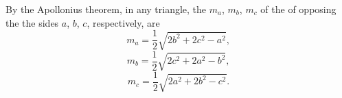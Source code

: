 \documentclass[12pt]{article}
\theoremstyle{definition}
\begin{document}
By the Apollonius theorem, in any triangle, the  $m_a$, $m_b$, $m_c$ of the  of opposing the the sides $a$, $b$, $c$, respectively,
are
$$m_a = \frac{1}{2}\sqrt{2b^2+2c^2-a^2},$$
$$m_b = \frac{1}{2}\sqrt{2c^2+2a^2-b^2},$$
$$m_c = \frac{1}{2}\sqrt{2a^2+2b^2-c^2}.$$
\end{document}
